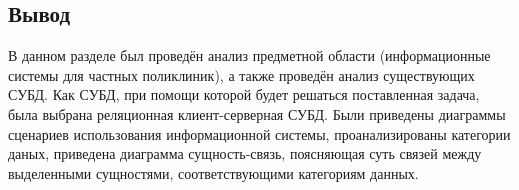 %
%
%
%
%
%
%
%

\subsection*{Вывод}
В данном разделе был проведён анализ предметной области (информационные системы для частных поликлиник), а также проведён анализ существующих СУБД. 
Как СУБД, при помощи которой будет решаться поставленная задача, была выбрана реляционная клиент-серверная СУБД.
Были приведены диаграммы сценариев использования информационной системы, проанализированы категории даных, приведена диаграмма сущность-связь, поясняющая суть связей между выделенными сущностями, соответствующими категориям данных.


